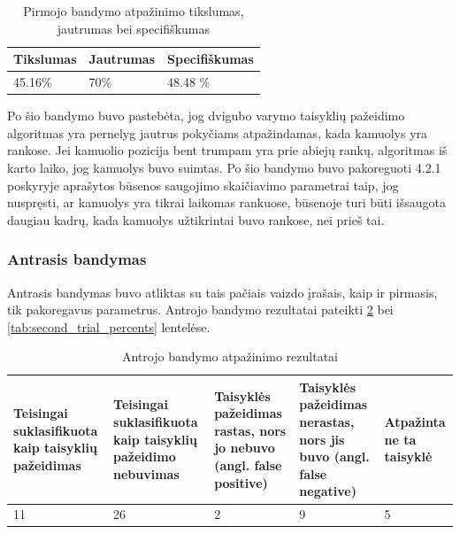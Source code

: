 \documentclass{VUMIFPSbakalaurinis}
\begin{document}
 \begin{table}[H]\footnotesize
	\centering
	\caption{Pirmojo bandymo atpažinimo tikslumas, jautrumas bei specifiškumas}
	{\begin{tabular}{|p{5cm}|p{5cm}|p{5cm}|} \hline
			\textbf{Tikslumas} & \textbf{Jautrumas} & \textbf{Specifiškumas} \\
			\hline
			45.16\%  & 70\%    & 48.48 \%    \\
			
			\hline
	\end{tabular}}
	\label{tab:first_trial_percents}
\end{table}

Po šio bandymo buvo pastebėta, jog dvigubo varymo taisyklių pažeidimo algoritmas yra pernelyg jautrus pokyčiams atpažindamas, kada kamuolys yra rankose. Jei kamuolio pozicija bent trumpam yra prie abiejų rankų, algoritmas iš karto laiko, jog kamuolys buvo suimtas. Po šio bandymo buvo pakoreguoti 4.2.1 poskyryje aprašytos būsenos saugojimo skaičiavimo parametrai taip, jog nuspręsti, ar kamuolys yra tikrai laikomas rankuose, būsenoje turi būti išsaugota daugiau kadrų, kada kamuolys užtikrintai buvo rankose, nei prieš tai.

\subsubsection{Antrasis bandymas}

Antrasis bandymas buvo atliktas su tais pačiais vaizdo įrašais, kaip ir pirmasis, tik pakoregavus parametrus. Antrojo bandymo rezultatai pateikti  \ref{tab:second_trial} bei \ref{tab:second_trial_percents} lentelėse.

\begin{table}[H]\footnotesize
	\centering
	\caption{Antrojo bandymo atpažinimo rezultatai}
	{\begin{tabular}{|p{3cm}|p{3cm}|p{3cm}|p{3cm}|p{2cm}|} \hline
			\textbf{Teisingai suklasifikuota kaip taisyklių pažeidimas} & \textbf{Teisingai suklasifikuota kaip taisyklių pažeidimo nebuvimas} & \textbf{Taisyklės pažeidimas rastas, nors jo nebuvo (angl. false positive)} & \textbf{Taisyklės pažeidimas nerastas, nors jis buvo (angl. false negative)} & \textbf{Atpažinta ne ta taisyklė} \\
			\hline
			11  & 26    & 2    & 9    & 5   \\
			\hline
	\end{tabular}}
	\label{tab:second_trial}
\end{table}
\end{document}
